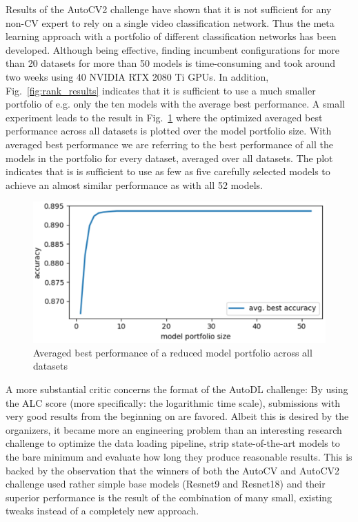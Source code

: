 \documentclass{article}
\begin{document}
Results of the AutoCV2 challenge have shown that it is not sufficient for any non-CV expert to rely on a single video classification network. Thus the meta learning approach with a portfolio of different classification networks has been developed. Although being effective, finding incumbent configurations for more than 20 datasets for more than 50 models is time-consuming and took around two weeks using 40 NVIDIA RTX 2080 Ti GPUs. In addition, Fig.~\ref{fig:rank_results} indicates that it is sufficient to use a much smaller portfolio of e.g. only the ten models with the average best performance. A small experiment leads to the result in Fig.~\ref{fig:portfolio_performance} where the optimized averaged best performance across all datasets is plotted over the model portfolio size.  With averaged best performance we are referring to the best performance of all the models in the portfolio for every dataset, averaged over all datasets. The plot indicates that is is sufficient to use as few as five carefully selected models to achieve an almost similar performance as with all 52 models.
%
\begin{figure}[htb]
\begin{center}
 	\includegraphics[width=0.85\linewidth]{../figures/portfolio_performance.eps} 
\end{center}
\caption{Averaged best performance of a reduced model portfolio across all datasets}
\label{fig:portfolio_performance}
\end{figure} 
%

A more substantial critic concerns the format of the AutoDL challenge: By using the ALC score (more specifically: the logarithmic time scale), submissions with very good results from the beginning on are favored. Albeit this is desired by the organizers, it became more an engineering problem than an interesting research challenge to optimize the data loading pipeline, strip state-of-the-art models to the bare minimum and evaluate how long they produce reasonable results. This is backed by the observation that the winners of both the AutoCV and AutoCV2 challenge used rather simple base models (Resnet9 and Resnet18) and their superior performance is the result of the combination of many small, existing tweaks instead of a completely new approach.
\end{document}

